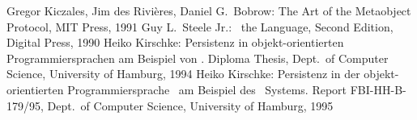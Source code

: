 %
\cleardoublepage
%
\begin{thebibliography}{XXXXXXXXXX}
%
Gregor Kiczales, Jim des Rivi\`{e}res, Daniel G.\ Bobrow:
The Art of the Metaobject Protocol,
MIT Press, 1991
%
Guy L.\ Steele Jr.:
\cl\ the Language, Second Edition,
Digital Press, 1990
%
Heiko Kirschke:
Persistenz in objekt-orientierten Programmiersprachen am Beispiel von
\clos.
Diploma Thesis,
Dept.\ of Computer Science, University of Hamburg,
1994
%
Heiko Kirschke:
Persistenz in der objekt-orientierten
Programmiersprache \clos\ am Beispiel
des \plob\ Systems.
Report FBI-HH-B-179/95,
Dept.\ of Computer Science, University of Hamburg,
1995
%
\end{thebibliography}
